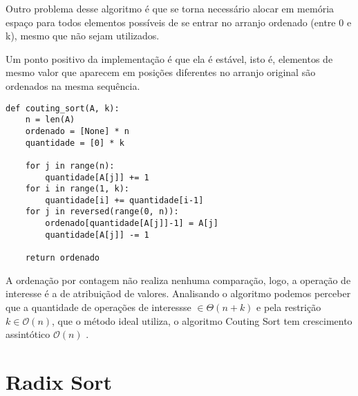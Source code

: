 \documentclass[a4paper, twocolumn]{article}
\theoremstyle{definition}
\begin{document}
Outro problema desse algoritmo é que se torna necessário alocar em memória espaço para todos elementos possíveis de se entrar no arranjo ordenado (entre 0 e k), mesmo que não sejam utilizados.

Um ponto positivo da implementação é que ela é estável, isto é, elementos de mesmo valor que aparecem em posições diferentes no arranjo original são ordenados na mesma sequência.

\begin{lstlisting}[label=Couting Sort,caption= Couting Sort]
def couting_sort(A, k):
    n = len(A)
    ordenado = [None] * n
    quantidade = [0] * k

    for j in range(n): 
        quantidade[A[j]] += 1
    for i in range(1, k): 
        quantidade[i] += quantidade[i-1]
    for j in reversed(range(0, n)):
        ordenado[quantidade[A[j]]-1] = A[j]
        quantidade[A[j]] -= 1

    return ordenado
\end{lstlisting}

A ordenação por contagem não realiza nenhuma comparação, logo, a operação de interesse é a de atribuiçãod de valores. Analisando o algoritmo podemos perceber que a quantidade de operações de interessse $\in \Theta(n+k)$ e pela restrição $k \in \mathcal{O}(n)$, que o método ideal utiliza, o algoritmo Couting Sort tem crescimento assintótico $\mathcal{O}(n)$ .

\section{Radix Sort}
\end{document}
